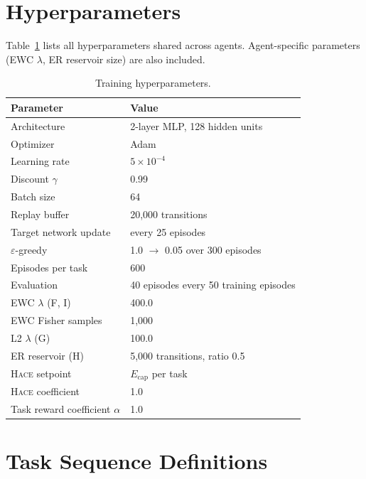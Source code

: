 \documentclass[sigplan,10pt]{acmart}
\newcommand{\energy}{E}
\newcommand{\hace}{\textsc{Hace}}
\begin{document}
\clearpage
\onecolumn
\appendix

\section{Hyperparameters}
\label{app:hyperparams}

Table~\ref{tab:hyperparams} lists all hyperparameters shared across
agents.  Agent-specific parameters (EWC $\lambda$, ER reservoir size)
are also included.

\begin{table}[h]
\centering
\caption{Training hyperparameters.}
\begin{tabular}{@{}ll@{}}
\toprule
\textbf{Parameter} & \textbf{Value} \\
\midrule
Architecture & 2-layer MLP, 128 hidden units \\
Optimizer & Adam \\
Learning rate & $5 \times 10^{-4}$ \\
Discount $\gamma$ & 0.99 \\
Batch size & 64 \\
Replay buffer & 20{,}000 transitions \\
Target network update & every 25 episodes \\
$\varepsilon$-greedy & 1.0 $\to$ 0.05 over 300 episodes \\
Episodes per task & 600 \\
Evaluation & 40 episodes every 50 training episodes \\
\midrule
EWC $\lambda$ (F, I) & 400.0 \\
EWC Fisher samples & 1{,}000 \\
L2 $\lambda$ (G) & 100.0 \\
ER reservoir (H) & 5{,}000 transitions, ratio 0.5 \\
\hace{} setpoint & $\energy_{\text{cap}}$ per task \\
\hace{} coefficient & 1.0 \\
Task reward coefficient $\alpha$ & 1.0 \\
\bottomrule
\end{tabular}
\label{tab:hyperparams}
\end{table}


\section{Task Sequence Definitions}
\label{app:sequences}
\end{document}
